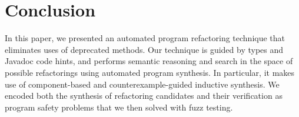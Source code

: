 \documentclass[10pt,conference]{IEEEtran}
\begin{document}
\section{Conclusion}

In this paper, we presented an automated program refactoring technique
that eliminates uses of deprecated methods. Our technique is guided by
types and Javadoc code hints, and performs semantic reasoning and
search in the space of possible refactorings using automated program
synthesis.  In particular, it makes use of component-based and
counterexample-guided inductive synthesis. We encoded both the
synthesis of refactoring candidates and their verification as program
safety problems that we then solved with fuzz testing.





%

%
\end{document}
